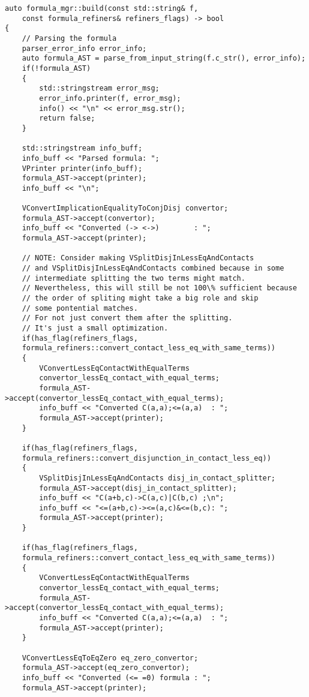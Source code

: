 \documentclass{article}
\begin{document}
			\begin{lstlisting}
auto formula_mgr::build(const std::string& f, 
	const formula_refiners& refiners_flags) -> bool
{
    // Parsing the formula
    parser_error_info error_info;
    auto formula_AST = parse_from_input_string(f.c_str(), error_info);
    if(!formula_AST)
    {
        std::stringstream error_msg;
        error_info.printer(f, error_msg);
        info() << "\n" << error_msg.str();
        return false;
    }

    std::stringstream info_buff;
    info_buff << "Parsed formula: ";
    VPrinter printer(info_buff);
    formula_AST->accept(printer);
    info_buff << "\n";

    VConvertImplicationEqualityToConjDisj convertor;
    formula_AST->accept(convertor);
    info_buff << "Converted (-> <->)        : ";
    formula_AST->accept(printer);

    // NOTE: Consider making VSplitDisjInLessEqAndContacts 
    // and VSplitDisjInLessEqAndContacts combined because in some 
    // intermediate splitting the two terms might match.
    // Nevertheless, this will still be not 100\% sufficient because 
    // the order of spliting might take a big role and skip 
    // some pontential matches. 
    // For not just convert them after the splitting. 
    // It's just a small optimization.
    if(has_flag(refiners_flags, 
	formula_refiners::convert_contact_less_eq_with_same_terms))
    {
        VConvertLessEqContactWithEqualTerms 
		convertor_lessEq_contact_with_equal_terms;
        formula_AST->accept(convertor_lessEq_contact_with_equal_terms);
        info_buff << "Converted C(a,a);<=(a,a)  : ";
        formula_AST->accept(printer);
    }

    if(has_flag(refiners_flags, 
	formula_refiners::convert_disjunction_in_contact_less_eq))
    {
        VSplitDisjInLessEqAndContacts disj_in_contact_splitter;
        formula_AST->accept(disj_in_contact_splitter);
        info_buff << "C(a+b,c)->C(a,c)|C(b,c) ;\n";
        info_buff << "<=(a+b,c)-><=(a,c)&<=(b,c): ";
        formula_AST->accept(printer);
    }

    if(has_flag(refiners_flags, 
	formula_refiners::convert_contact_less_eq_with_same_terms))
    {
        VConvertLessEqContactWithEqualTerms 
		convertor_lessEq_contact_with_equal_terms;
        formula_AST->accept(convertor_lessEq_contact_with_equal_terms);
        info_buff << "Converted C(a,a);<=(a,a)  : ";
        formula_AST->accept(printer);
    }

    VConvertLessEqToEqZero eq_zero_convertor;
    formula_AST->accept(eq_zero_convertor);
    info_buff << "Converted (<= =0) formula : ";
    formula_AST->accept(printer);


\end{lstlisting}
\end{document}
